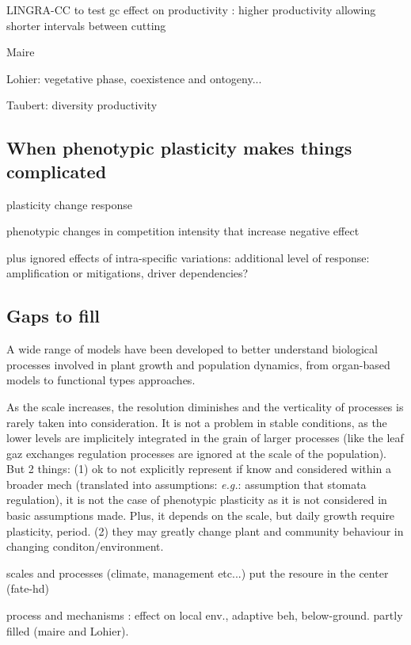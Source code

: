 LINGRA-CC \cite{rodriguez_lingra-cc:_1999} to test gc effect on productivity : higher productivity allowing shorter intervals between cutting

Maire

Lohier: vegetative phase, coexistence and ontogeny... 

Taubert: diversity productivity 


\subsection{When phenotypic plasticity makes things complicated}

plasticity change response \cite{morin_comparing_2009}

phenotypic changes in competition intensity that increase negative effect \parencite{hanel_phenotypic_2015}

plus ignored effects of intra-specific variations: additional level of response: amplification or mitigations, driver dependencies?

\subsection{Gaps to fill}

A wide range of models have been developed to better understand biological processes involved in plant growth and population dynamics, from organ-based models to functional types approaches.

As the scale increases, the resolution diminishes and the verticality of processes is rarely taken into consideration. It is not a problem in stable conditions, as the lower levels are implicitely integrated in the grain of larger processes (like the leaf gaz exchanges regulation processes are ignored at the scale of the population). But 2 things:
(1) ok to not explicitly represent if know and considered within a broader mech (translated into assumptions: \textit{e.g.}: assumption that stomata regulation), it is not the case of phenotypic plasticity as it is not considered in basic assumptions made. Plus, it depends on the scale, but daily growth require plasticity, period.
(2) they may greatly change plant and community behaviour in changing conditon/environment.
 
scales and processes (climate, management etc...)
put the resoure in the center (fate-hd)

process and mechanisms
\parencite{berger_competition_2008}: effect on local env., adaptive beh, below-ground.
partly filled (maire and Lohier).

